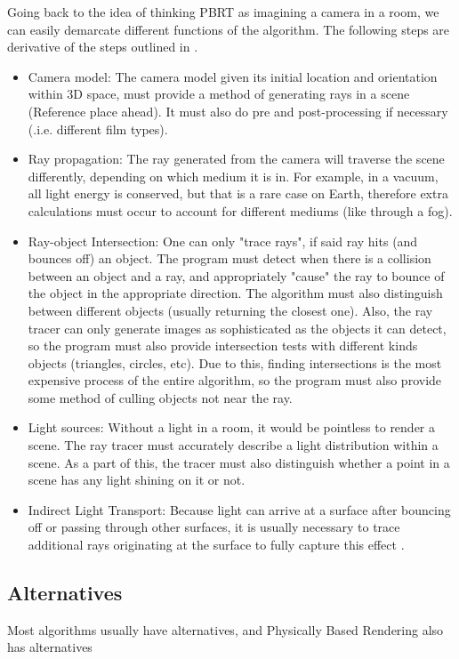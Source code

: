 \documentclass[../main.tex]{subfiles}
\begin{document}
Going back to the idea of thinking PBRT as imagining a camera in a room, we can easily demarcate different functions of the algorithm.
The following steps are derivative of the steps outlined in \cite{pharrPhysicallyBasedRendering2016}.
\begin{itemize}
  \item Camera model: The camera model given its initial location and orientation within 3D space, must provide a method of generating rays in a scene (Reference place ahead). It must also do pre and post-processing if necessary (.i.e. different film types).
  \item Ray propagation: The ray generated from the camera will traverse the scene differently, depending on which medium it is in. For example, in a vacuum, all light energy is conserved, but that is a rare case on Earth, therefore extra calculations must occur to account for different mediums (like through a fog).
  \item Ray-object Intersection: One can only "trace rays", if said ray hits (and bounces off) an object. The program must detect when there is a collision between an object and a ray, and appropriately "cause" the ray to bounce of the object in the appropriate direction.
    The algorithm must also distinguish between different objects (usually returning the closest one). Also, the ray tracer can only generate images as sophisticated as the objects it can detect, so the program must also provide intersection tests with different kinds objects (triangles, circles, etc). Due to this, finding intersections is the most expensive process of the entire algorithm, so the program must also provide some method of culling objects not near the ray.
  \item Light sources: Without a light in a room, it would be pointless to render a scene. The ray tracer must accurately describe a light distribution within a scene. As a part of this, the tracer must also distinguish whether a point in a scene has any light shining on it or not.
  \item Indirect Light Transport: Because light can arrive at a surface after bouncing off or passing through other surfaces, it is usually necessary to trace additional rays originating at the surface to fully capture this effect \cite{pharrPhysicallyBasedRendering2016}. 
\end{itemize}
\subsection{Alternatives}
Most algorithms usually have alternatives, and Physically Based Rendering also has alternatives
\end{document}
